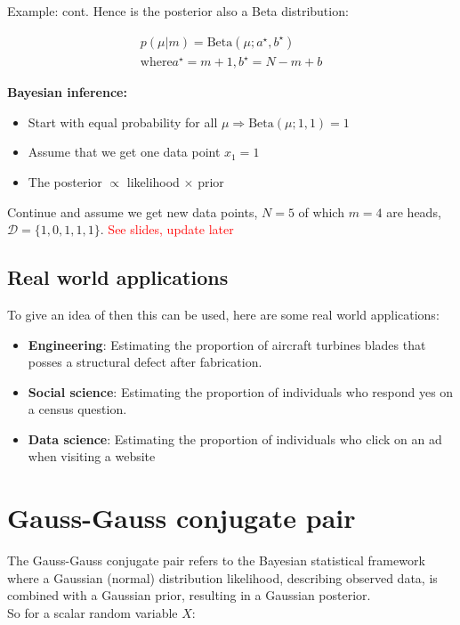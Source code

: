     \begin{example}{Example: cont. }
        Hence is the posterior also a Beta distribution:
 
        \begin{equation}
        \begin{aligned}
            p(\mu|m) = \text{Beta}(\mu; a^{\star},b^{\star}) \\
            \text{where} a^{\star} = m+1, b^{\star} = N-m+b 
        \end{aligned}
        \end{equation}
    
    \textbf{Bayesian inference:}
    \begin{itemize}
        \item Start with equal probability for all $\mu \Rightarrow \text{Beta}(\mu;1,1) =1$
        \item Assume that we get one data point $x_1 = 1$
        \item The posterior $\propto$ likelihood $\times$ prior
    \end{itemize} 

    Continue and assume we get new data points, $N = 5$ of which $m =4$ are heads, $\mathcal{D} = \{1,0,1,1,1\}$. \textcolor{red}{See slides, update later}

    \end{example}



    \subsection*{Real world applications}
    To give an idea of then this can be used, here are some real world applications:
    
    \begin{itemize}
        \item \textbf{Engineering}: Estimating the proportion of aircraft turbines blades that posses a structural defect after fabrication.
        \item \textbf{Social science}: Estimating the proportion of individuals who respond yes on a census question. 
        \item \textbf{Data science}: Estimating the proportion of individuals who click on an ad when visiting a website 
    \end{itemize}

    \section{Gauss-Gauss conjugate pair}
    The Gauss-Gauss conjugate pair refers to the Bayesian statistical framework where a Gaussian (normal) distribution likelihood, describing observed data, is combined with a Gaussian prior, resulting in a Gaussian posterior. \\
    So for a scalar random variable $X$:

